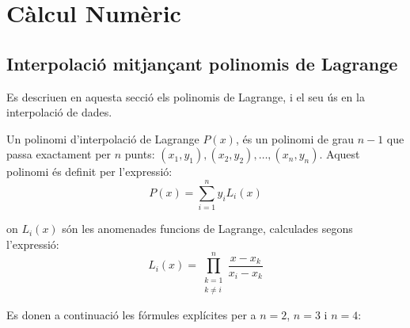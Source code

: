 \chapter{Càlcul Numèric}\label{sec:ch-calc-num}

\section{Interpolació mitjançant polinomis de Lagrange}
\label{sec:poli_lagr}

Es descriuen en aquesta secció els polinomis de Lagrange, i el seu ús en la interpolació de dades.

Un polinomi d'interpolació de Lagrange $P(x)$, és un polinomi de grau $n-1$ que passa exactament per $n$ punts:
$(x_1, y_1), (x_2, y_2), \dots, (x_n, y_n)$. Aquest polinomi és definit per l'expressió:
\begin{equation}
  P(x) = \sum_{i=1}^{n}  y_i L_i(x) \label{eq:poly_lag_1}
\end{equation}

on $L_i(x)$ són les anomenades funcions de Lagrange, calculades segons l'expressió:
\begin{equation}
  L_i(x) = \prod_{\substack{k=1 \\ k\neq i}}^{n} \frac{x-x_k}{x_i-x_k} \label{eq:poly_lag_2}
\end{equation}

Es donen a continuació les fórmules explícites per a $n = 2$, $n=3$ i $n=4$:

